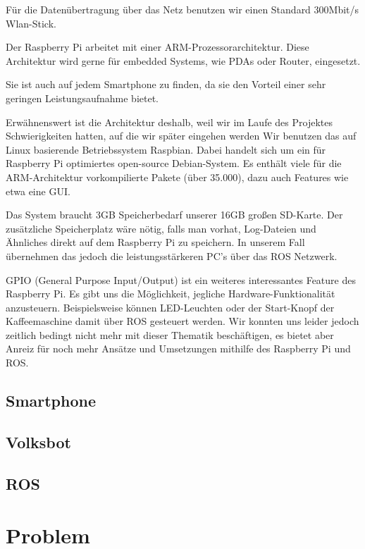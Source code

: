 \documentclass[12pt]{article}
\begin{document}
Für die Datenübertragung über das Netz benutzen wir einen Standard 300Mbit/s Wlan-Stick.

Der Raspberry Pi arbeitet mit einer ARM-Prozessorarchitektur.
Diese Architektur wird gerne für embedded Systems, wie PDAs oder Router, eingesetzt.

Sie ist auch auf jedem Smartphone zu finden, da sie den Vorteil einer sehr geringen Leistungsaufnahme bietet. 

Erwähnenswert ist die Architektur deshalb, weil wir im Laufe des Projektes Schwierigkeiten hatten, auf die wir später eingehen werden
Wir benutzen das auf Linux basierende Betriebssystem Raspbian.
Dabei handelt sich um ein für Raspberry Pi optimiertes open-source Debian-System.
Es enthält viele für die ARM-Architektur vorkompilierte Pakete (über 35.000), dazu auch Features wie etwa eine GUI.

Das System braucht 3GB Speicherbedarf unserer 16GB großen SD-Karte.
Der zusätzliche Speicherplatz wäre nötig, falls man vorhat, Log-Dateien und Ähnliches direkt auf dem Raspberry Pi zu speichern. 
In unserem Fall übernehmen das jedoch die leistungsstärkeren PC's über das ROS Netzwerk.

GPIO (General Purpose Input/Output) ist ein weiteres interessantes Feature des Raspberry Pi.
Es gibt uns die Möglichkeit, jegliche Hardware-Funktionalität anzusteuern.
Beispielsweise können LED-Leuchten oder der Start-Knopf der Kaffeemaschine damit über ROS gesteuert werden.
Wir konnten uns leider jedoch zeitlich bedingt nicht mehr mit dieser Thematik beschäftigen, es bietet aber Anreiz für noch mehr Ansätze und Umsetzungen mithilfe des Raspberry Pi und ROS.


\subsection{Smartphone}

\subsection{Volksbot}

\subsection{ROS}



\section{Problem}
\end{document}
